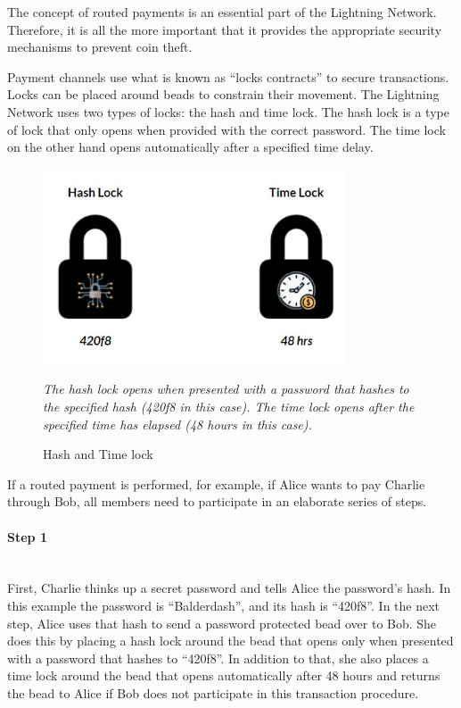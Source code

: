 \documentclass[a4paper, 12pt]{report}
\begin{document}
\par The concept of routed payments is an essential part of the Lightning Network. Therefore, it is all the more important that it provides the appropriate security mechanisms to prevent coin theft.

\par Payment channels use what is known as “locks contracts” to secure transactions. Locks can be placed around beads to constrain their movement. The Lightning Network uses two types of locks: the hash and time lock. The hash lock is a type of lock that only opens when provided with the correct password. The time lock on the other hand opens automatically after a specified time delay.\cite{peter}

\begin{figure}[H]
	\centering
	\includegraphics[width=9cm]{10_Locks}
	\caption{Hash and Time lock}
	\medskip
	\small \textit{The hash lock opens when presented with a password that hashes to the specified hash (420f8 in this case). The time lock opens after the specified time has elapsed (48 hours in this case).}
	\label{fig:10_Locks}
\end{figure}

\par If a routed payment is performed, for example, if Alice wants to pay Charlie through Bob, all members need to participate in an elaborate series of steps.

\paragraph{Step 1} \hspace{0pt} \\
First, Charlie thinks up a secret password and tells Alice the password’s hash. In this example the password is “Balderdash”, and its hash is “420f8”. In the next step, Alice uses that hash to send a password protected bead over to Bob. She does this by placing a hash lock around the bead that opens only when presented with a password that hashes to “420f8”. In addition to that, she also places a time lock around the bead that opens automatically after 48 hours and returns the bead to Alice if Bob does not participate in this transaction procedure.
\end{document}
